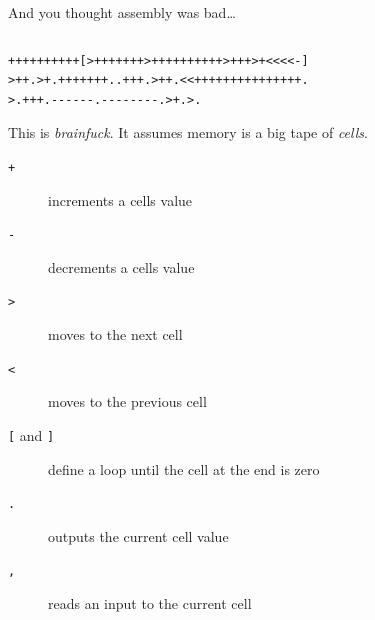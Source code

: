 \documentclass[9pt,aspectratio=169]{beamer}
\begin{document}
\begin{frame}[label={sec:org456b4b3},fragile]{And you thought assembly was bad\ldots{}}
 \begin{columns}
\begin{column}[t]{0.79\columnwidth}
\begin{verbatim}
++++++++++[>+++++++>++++++++++>+++>+<<<<-]
>++.>+.+++++++..+++.>++.<<+++++++++++++++.
>.+++.------.--------.>+.>.
\end{verbatim}

This is \emph{brainfuck}.  It assumes memory is a big tape of \emph{cells}.
\begin{description}
\item[{\texttt{+}}] increments a cells value
\item[{\texttt{-}}] decrements a cells value
\item[{\texttt{>}}] moves to the next cell
\item[{\texttt{<}}] moves to the previous cell
\item[{\texttt{[} and \texttt{]}}] define a loop until the cell at the end is zero
\item[{\texttt{.}}] outputs the current cell value
\item[{\texttt{,}}] reads an input to the current cell
\end{description}


\end{column}
\end{columns}
\end{frame}
\end{document}
